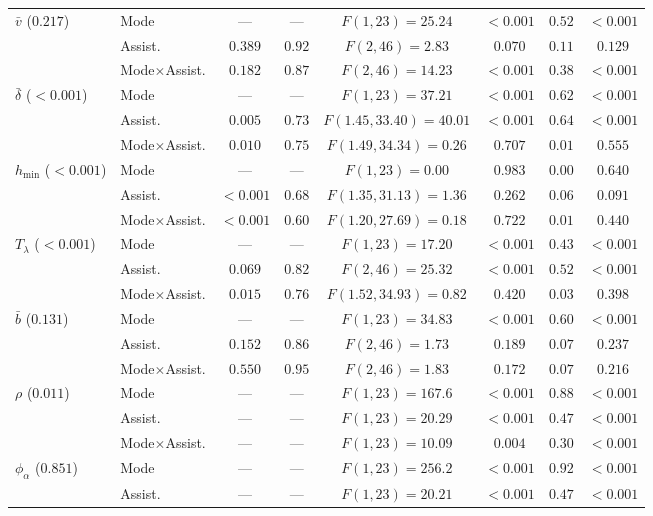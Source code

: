 \begin{table}[p]
\begin{tabular}{@{}llcccccc@{}}
\addlinespace[2pt]
$\bar{v}$ ($0.217$) & Mode & --- & --- & $F(1,23)=25.24$ & $<0.001$ & $0.52$ & $<0.001$ \\
 & Assist. & $0.389$ & $0.92$ & $F(2,46)=2.83$ & $0.070$ & $0.11$ & $0.129$ \\
 & Mode$\times$Assist. & $0.182$ & $0.87$ & $F(2,46)=14.23$ & $<0.001$ & $0.38$ & $<0.001$ \\
\addlinespace[2pt]
$\bar{\delta}$ ($<0.001$) & Mode & --- & --- & $F(1,23)=37.21$ & $<0.001$ & $0.62$ & $<0.001$ \\
 & Assist. & $0.005$ & $0.73$ & $F(1.45,33.40)=40.01$ & $<0.001$ & $0.64$ & $<0.001$ \\
 & Mode$\times$Assist. & $0.010$ & $0.75$ & $F(1.49,34.34)=0.26$ & $0.707$ & $0.01$ & $0.555$ \\
\addlinespace[2pt]
$h_{\min}$ ($<0.001$) & Mode & --- & --- & $F(1,23)=0.00$ & $0.983$ & $0.00$ & $0.640$ \\
 & Assist. & $<0.001$ & $0.68$ & $F(1.35,31.13)=1.36$ & $0.262$ & $0.06$ & $0.091$ \\
 & Mode$\times$Assist. & $<0.001$ & $0.60$ & $F(1.20,27.69)=0.18$ & $0.722$ & $0.01$ & $0.440$ \\
\addlinespace[2pt]
$T_{\lambda}$ ($<0.001$) & Mode & --- & --- & $F(1,23)=17.20$ & $<0.001$ & $0.43$ & $<0.001$ \\
 & Assist. & $0.069$ & $0.82$ & $F(2,46)=25.32$ & $<0.001$ & $0.52$ & $<0.001$ \\
 & Mode$\times$Assist. & $0.015$ & $0.76$ & $F(1.52,34.93)=0.82$ & $0.420$ & $0.03$ & $0.398$ \\
\addlinespace[2pt]
$\bar{b}$ ($0.131$) & Mode & --- & --- & $F(1,23)=34.83$ & $<0.001$ & $0.60$ & $<0.001$ \\
 & Assist. & $0.152$ & $0.86$ & $F(2,46)=1.73$ & $0.189$ & $0.07$ & $0.237$ \\
 & Mode$\times$Assist. & $0.550$ & $0.95$ & $F(2,46)=1.83$ & $0.172$ & $0.07$ & $0.216$ \\
\addlinespace[2pt]
$\rho$ ($0.011$) & Mode & --- & --- & $F(1,23)=167.6$ & $<0.001$ & $0.88$ & $<0.001$ \\
 & Assist. & --- & --- & $F(1,23)=20.29$ & $<0.001$ & $0.47$ & $<0.001$ \\
 & Mode$\times$Assist. & --- & --- & $F(1,23)=10.09$ & $0.004$ & $0.30$ & $<0.001$ \\
\addlinespace[2pt]
$\phi_\alpha$ ($0.851$) & Mode & --- & --- & $F(1,23)=256.2$ & $<0.001$ & $0.92$ & $<0.001$ \\
 & Assist. & --- & --- & $F(1,23)=20.21$ & $<0.001$ & $0.47$ & $<0.001$ \\

\end{tabular}
\end{table}
